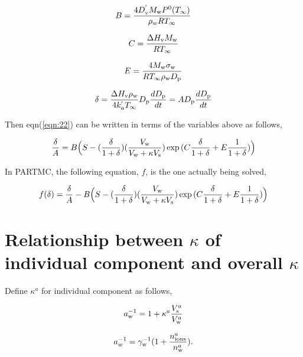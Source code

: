 \documentclass[12pt]{article}
\begin{document}
\begin{equation}
B=\frac{4 D_{\rm v}^{'} M_{\rm w} P^{\rm 0}(T_{\infty})}{\rho_w R T_{\infty}}
\end{equation}

\begin{equation}
C=\frac{\Delta H_{\rm v} M_{\rm w}}{R T_{\infty}}
\end{equation}

\begin{equation}
E=\frac{4 M_{\rm w}\sigma_{\rm w}}{R T_{\infty} \rho_{\rm w} D_{\rm p}}
\end{equation}

\begin{equation}\label{eqn:23}
\delta=\frac{\Delta H_{\rm v} \rho_{\rm w}}{4 k_a^{'} T_{\infty}} D_{\rm p} \frac{d D_{\rm p}}{dt}=A D_{\rm p} \frac{d D_{\rm p}}{dt}
\end{equation}

Then eqn(\ref{eqn:22}) can be written in terms of the variables above as follows,

\begin{equation}\label{eqn:22a}
\frac{\delta}{A}=B\Big(S-(\frac{\delta}{1+\delta}) (\frac{V_{\rm w}}{V_{\rm w}+\kappa V_{\rm s}})\exp{(C \frac{\delta}{1+\delta} +E \frac{1}{1+\delta})}\Big)
\end{equation}

In PARTMC, the following equation, $f$, is the one actually being solved,

\begin{equation}\label{eqn:22b}
f(\delta)=\frac{\delta}{A}-B\Big(S-(\frac{\delta}{1+\delta}) (\frac{V_{\rm w}}{V_{\rm w}+\kappa V_{\rm s}})\exp{(C \frac{\delta}{1+\delta} +E \frac{1}{1+\delta})}\Big)
\end{equation}

\section{Relationship between $\kappa$ of individual component and overall $\kappa$}

Define $\kappa^{a}$ for individual component as follows, 

\begin{equation}\label{eqn:23}
a_{\rm w}^{-1}=1+\kappa^{a} \frac{V_{\rm s}^{a}}{V_{\rm w}^{a}} 
\end{equation}

\begin{equation}\label{eqn:24}
a_{w}^{-1}=\gamma_{\rm w}^{-1} (1+\frac{n_{\rm ions}^{a}}{n_{\rm w}^{a}}).
\end{equation}
\end{document}
